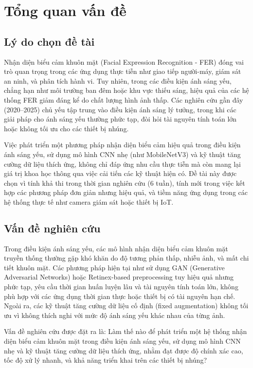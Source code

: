 \section{Tổng quan vấn đề} %
\subsection{Lý do chọn đề tài}
Nhận diện biểu cảm khuôn mặt (Facial Expression Recognition - FER) đóng vai trò quan trọng trong các ứng dụng thực tiễn như giao tiếp người-máy, giám sát an ninh, và phân tích hành vi. Tuy nhiên, trong các điều kiện ánh sáng yếu, chẳng hạn như môi trường ban đêm hoặc khu vực thiếu sáng, hiệu quả của các hệ thống FER giảm đáng kể do chất lượng hình ảnh thấp. Các nghiên cứu gần đây (2020--2025) chủ yếu tập trung vào điều kiện ánh sáng lý tưởng, trong khi các giải pháp cho ánh sáng yếu thường phức tạp, đòi hỏi tài nguyên tính toán lớn hoặc không tối ưu cho các thiết bị nhúng. 

Việc phát triển một phương pháp nhận diện biểu cảm hiệu quả trong điều kiện ánh sáng yếu, sử dụng mô hình CNN nhẹ (như MobileNetV3) và kỹ thuật tăng cường dữ liệu thích ứng, không chỉ đáp ứng nhu cầu thực tiễn mà còn mang lại giá trị khoa học thông qua việc cải tiến các kỹ thuật hiện có. Đề tài này được chọn vì tính khả thi trong thời gian nghiên cứu (6 tuần), tính mới trong việc kết hợp các phương pháp đơn giản nhưng hiệu quả, và tiềm năng ứng dụng trong các hệ thống thực tế như camera giám sát hoặc thiết bị IoT.

\subsection{Vấn đề nghiên cứu}
Trong điều kiện ánh sáng yếu, các mô hình nhận diện biểu cảm khuôn mặt truyền thống thường gặp khó khăn do độ tương phản thấp, nhiễu ảnh, và mất chi tiết khuôn mặt. Các phương pháp hiện tại như sử dụng GAN (Generative Adversarial Networks) hoặc Retinex-based preprocessing tuy hiệu quả nhưng phức tạp, yêu cầu thời gian huấn luyện lâu và tài nguyên tính toán lớn, không phù hợp với các ứng dụng thời gian thực hoặc thiết bị có tài nguyên hạn chế. Ngoài ra, các kỹ thuật tăng cường dữ liệu cố định (fixed augmentation) không tối ưu vì không thích nghi với mức độ ánh sáng yếu khác nhau của từng ảnh.

Vấn đề nghiên cứu được đặt ra là: Làm thế nào để phát triển một hệ thống nhận diện biểu cảm khuôn mặt trong điều kiện ánh sáng yếu, sử dụng mô hình CNN nhẹ và kỹ thuật tăng cường dữ liệu thích ứng, nhằm đạt được độ chính xác cao, tốc độ xử lý nhanh, và khả năng triển khai trên các thiết bị nhúng?

